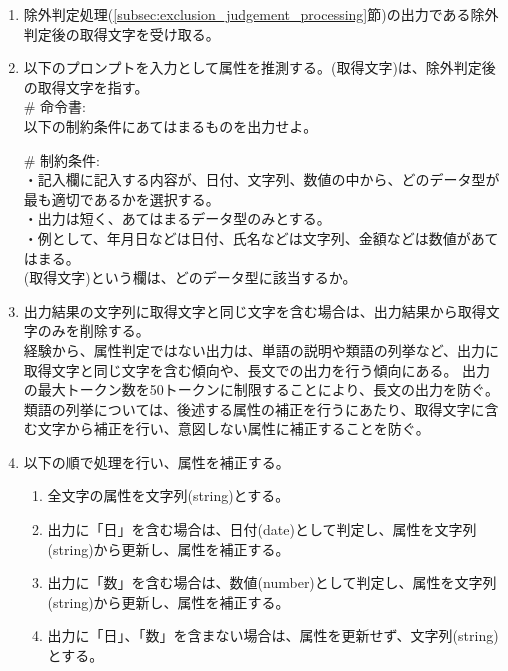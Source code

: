 \begin{enumerate}
    \item 除外判定処理(\ref{subsec:exclusion_judgement_processing}節)の出力である除外判定後の取得文字を受け取る。
    \item 以下のプロンプトを入力として属性を推測する。(取得文字)は、除外判定後の取得文字を指す。\\
        \# 命令書:\\
        以下の制約条件にあてはまるものを出力せよ。
        
        \# 制約条件:\\
        ・記入欄に記入する内容が、日付、文字列、数値の中から、どのデータ型が最も適切であるかを選択する。\\
        ・出力は短く、あてはまるデータ型のみとする。\\
        ・例として、年月日などは日付、氏名などは文字列、金額などは数値があてはまる。\\
        
        (取得文字)という欄は、どのデータ型に該当するか。

    \item 出力結果の文字列に取得文字と同じ文字を含む場合は、出力結果から取得文字のみを削除する。\\
        経験から、属性判定ではない出力は、単語の説明や類語の列挙など、出力に取得文字と同じ文字を含む傾向や、長文での出力を行う傾向にある。
        出力の最大トークン数を50トークンに制限することにより、長文の出力を防ぐ。
        類語の列挙については、後述する属性の補正を行うにあたり、取得文字に含む文字から補正を行い、意図しない属性に補正することを防ぐ。
    \item 以下の順で処理を行い、属性を補正する。
        \begin{enumerate}
            \item 全文字の属性を文字列(string)とする。
            \item 出力に「日」を含む場合は、日付(date)として判定し、属性を文字列(string)から更新し、属性を補正する。
            \item 出力に「数」を含む場合は、数値(number)として判定し、属性を文字列(string)から更新し、属性を補正する。
            \item 出力に「日」、「数」を含まない場合は、属性を更新せず、文字列(string)とする。
        \end{enumerate}
\end{enumerate}

